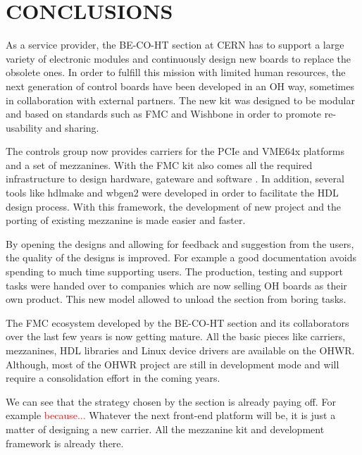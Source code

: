 \documentclass{JAC2003}
\begin{document}
\section{CONCLUSIONS}

As a service provider, the BE-CO-HT section at CERN has to support a large variety of electronic modules and continuously design new boards to replace the obsolete ones.
In order to fulfill this mission with limited human resources, the next generation of control boards have been developed in an OH way, sometimes in collaboration with external partners.
The new kit was designed to be modular and based on standards such as FMC and Wishbone in order to promote re-usability and sharing.

The controls group now provides carriers for the PCIe and VME64x platforms and a set of mezzanines.
With the FMC kit also comes all the required infrastructure to design hardware, gateware and software .
In addition, several tools like hdlmake and wbgen2 were developed in order to facilitate the HDL design process.
With this framework, the development of new project and the porting of existing mezzanine is made easier and faster.

By opening the designs and allowing for feedback and suggestion from the users, the quality of the designs is improved.
For example a good documentation avoids spending to much time supporting users.
The production, testing and support tasks were handed over to companies which are now selling OH boards as their own product.
This new model allowed to unload the section from boring tasks.

The FMC ecosystem developed by the BE-CO-HT section and its collaborators over the last few years is now getting mature.
All the basic pieces like carriers, mezzanines, HDL libraries and Linux device drivers are available on the OHWR.
Although, most of the OHWR project are still in development mode and will require a consolidation effort in the coming years.

We can see that the strategy chosen by the section is already paying off.
For example
\textcolor{red}{because...}
Whatever the next front-end platform will be, it is just a matter of designing a new carrier. All the mezzanine kit and development framework is already there.
\end{document}
